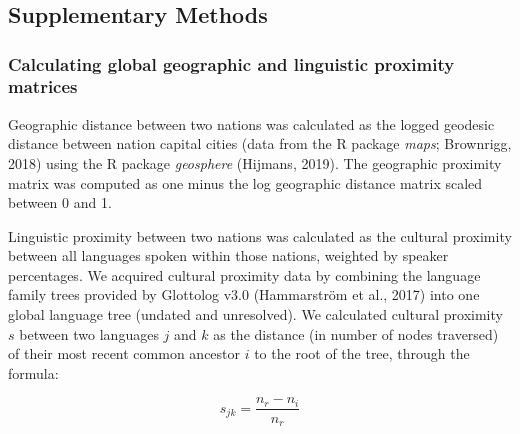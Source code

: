 \documentclass[
  man,floatsintext]{apa6}
\begin{document}
\endgroup

\newpage

\hypertarget{appendix-appendix}{%
\appendix}


\renewcommand{\appendixname}{\bf{Supplementary Material}}
\renewcommand{\figurename}{Supplementary Figure}
\renewcommand{\tablename}{Supplementary Table}
\renewcommand{\thefigure}{S\arabic{figure}} \setcounter{figure}{0}
\renewcommand{\thetable}{S\arabic{table}} \setcounter{table}{0}
\renewcommand{\theequation}{S\arabic{table}} \setcounter{equation}{0}

\hypertarget{section}{%
\section{}\label{section}}

\hypertarget{supplementary-methods}{%
\subsection{Supplementary Methods}\label{supplementary-methods}}

\hypertarget{calculating-global-geographic-and-linguistic-proximity-matrices}{%
\subsubsection{Calculating global geographic and linguistic proximity matrices}\label{calculating-global-geographic-and-linguistic-proximity-matrices}}

Geographic distance between two nations was calculated as the logged geodesic distance between nation capital cities (data from the R package \emph{maps}; Brownrigg, 2018) using the R package \emph{geosphere} (Hijmans, 2019). The geographic proximity matrix was computed as one minus the log geographic distance matrix scaled between 0 and 1.

Linguistic proximity between two nations was calculated as the cultural proximity between all languages spoken within those nations, weighted by speaker percentages. We acquired cultural proximity data by combining the language family trees provided by Glottolog v3.0 (Hammarström et al., 2017) into one global language tree (undated and unresolved). We calculated cultural proximity \(s\) between two languages \(j\) and \(k\) as the distance (in number of nodes traversed) of their most recent common ancestor \(i\) to the root of the tree, through the formula:

\[
s_{jk} = \frac{n_{r}-n_{i}}{n_{r}}
\]
\end{document}
